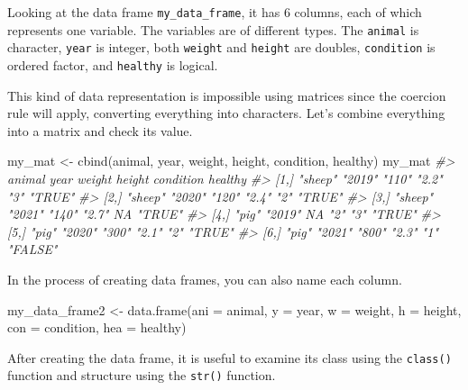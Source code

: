 \documentclass[
]{book}
\newenvironment{Shaded}{\begin{snugshade}}{\end{snugshade}}
\newcommand{\AttributeTok}[1]{\textcolor[rgb]{0.77,0.63,0.00}{#1}}
\newcommand{\CommentTok}[1]{\textcolor[rgb]{0.56,0.35,0.01}{\textit{#1}}}
\newcommand{\FunctionTok}[1]{\textcolor[rgb]{0.00,0.00,0.00}{#1}}
\newcommand{\NormalTok}[1]{#1}
\newcommand{\OtherTok}[1]{\textcolor[rgb]{0.56,0.35,0.01}{#1}}
\newenvironment{blackbox}{
  \definecolor{shadecolor}{rgb}{0, 0, 0}  %
  \color{white}
  \begin{shaded}}
 {\end{shaded}}
\newenvironment{infobox}[1]
  {
  \begin{itemize}
  \renewcommand{\labelitemi}{
    \raisebox{-.7\height}[0pt][0pt]{
      {\setkeys{Gin}{width=3em,keepaspectratio}
        \texttt{[image: pics/\#1]}}
    }
  }
  \setlength{\fboxsep}{1em}
  \begin{blackbox}
  \item
  }
  {
  \end{blackbox}
  \end{itemize}
  }
\begin{document}
Looking at the data frame \texttt{my\_data\_frame}, it has 6 columns, each of which represents one variable. The variables are of different types. The \texttt{animal} is character, \texttt{year} is integer, both \texttt{weight} and \texttt{height} are doubles, \texttt{condition} is ordered factor, and \texttt{healthy} is logical.

\begin{infobox}{caution}

This kind of data representation is impossible using matrices since the coercion rule will apply, converting everything into characters. Let's combine everything into a matrix and check its value.

\begin{Shaded}
\begin{Highlighting}[]
\NormalTok{my\_mat }\OtherTok{\textless{}{-}} \FunctionTok{cbind}\NormalTok{(animal, year, weight, height, condition, healthy)}
\NormalTok{my\_mat}
\CommentTok{\#\textgreater{}      animal  year   weight height condition healthy}
\CommentTok{\#\textgreater{} [1,] "sheep" "2019" "110"  "2.2"  "3"       "TRUE" }
\CommentTok{\#\textgreater{} [2,] "sheep" "2020" "120"  "2.4"  "2"       "TRUE" }
\CommentTok{\#\textgreater{} [3,] "sheep" "2021" "140"  "2.7"  NA        "TRUE" }
\CommentTok{\#\textgreater{} [4,] "pig"   "2019" NA     "2"    "3"       "TRUE" }
\CommentTok{\#\textgreater{} [5,] "pig"   "2020" "300"  "2.1"  "2"       "TRUE" }
\CommentTok{\#\textgreater{} [6,] "pig"   "2021" "800"  "2.3"  "1"       "FALSE"}
\end{Highlighting}
\end{Shaded}

\end{infobox}

In the process of creating data frames, you can also name each column.

\begin{Shaded}
\begin{Highlighting}[]
\NormalTok{my\_data\_frame2 }\OtherTok{\textless{}{-}} \FunctionTok{data.frame}\NormalTok{(}\AttributeTok{ani =}\NormalTok{ animal, }\AttributeTok{y =}\NormalTok{ year, }\AttributeTok{w =}\NormalTok{ weight, }\AttributeTok{h =}\NormalTok{ height, }\AttributeTok{con =}\NormalTok{ condition, }\AttributeTok{hea =}\NormalTok{ healthy)}
\end{Highlighting}
\end{Shaded}

After creating the data frame, it is useful to examine its class using the \texttt{class()} function and structure using the \texttt{str()} function.
\end{document}
